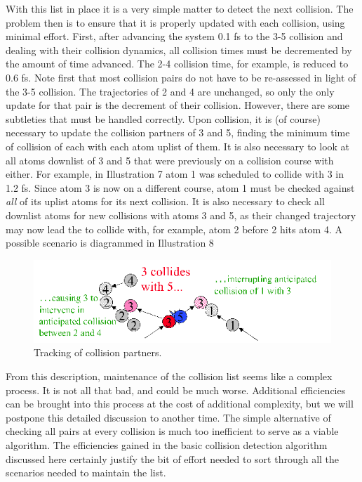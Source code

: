 \documentclass[]{article}
\begin{document}
With this list in place it is a very simple matter to detect the next
collision. The problem then is to ensure that it is properly updated
with each collision, using minimal effort. First, after advancing the
system 0.1 fs to the 3-5 collision and dealing with their collision
dynamics, all collision times must be decremented by the amount of time
advanced. The 2-4 collision time, for example, is reduced to 0.6 fs.
Note first that most collision pairs do not have to be re-assessed in
light of the 3-5 collision. The trajectories of 2 and 4 are unchanged,
so only the only update for that pair is the decrement of their
collision. However, there are some subtleties that must be handled
correctly. Upon collision, it is (of course) necessary to update the
collision partners of 3 and 5, finding the minimum time of collision of
each with each atom uplist of them. It is also necessary to look at all
atoms downlist of 3 and 5 that were previously on a collision course
with either. For example, in Illustration 7 atom 1 was scheduled to
collide with 3 in 1.2 fs. Since atom 3 is now on a different course,
atom 1 must be checked against \emph{all} of its uplist atoms for its
next collision. It is also necessary to check all downlist atoms for new
collisions with atoms 3 and 5, as their changed trajectory may now lead
the to collide with, for example, atom 2 before 2 hits atom 4. A
possible scenario is diagrammed in Illustration 8

\begin{figure}
  \centering
  \includegraphics[width=\textwidth]{HSMD_figures/image042}
  \caption{\label{fig:collisionTracking}Tracking of collision partners.}
\end{figure}

From this description, maintenance of the collision list seems like a
complex process. It is not all that bad, and could be much worse.
Additional efficiencies can be brought into this process at the cost of
additional complexity, but we will postpone this detailed discussion to
another time. The simple alternative of checking all pairs at every
collision is much too inefficient to serve as a viable algorithm. The
efficiencies gained in the basic collision detection algorithm discussed
here certainly justify the bit of effort needed to sort through all the
scenarios needed to maintain the list.
\end{document}
